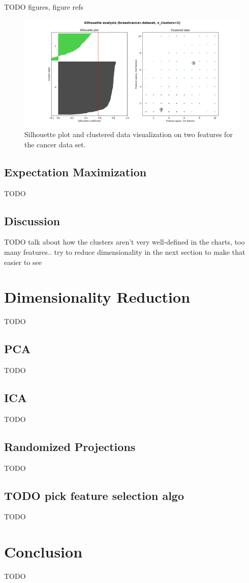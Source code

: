 \documentclass{article}
\begin{document}
      TODO figures, figure refs 

      \begin{figure}[htb]
      \centering
      \includegraphics[width=\linewidth]{out/kmeans/cancer-2-clusters.png}
      \caption{Silhouette plot and clustered data visualization on two features for the cancer data set.}
      \label{fig:km-silhouette-cancer}
      \end{figure}

    \subsection{Expectation Maximization}
      TODO

    \subsection{Discussion}
      TODO talk about how the clusters aren't very well-defined in the charts, too many features.. try to reduce dimensionality in the next section to make that easier to see

  \section{Dimensionality Reduction}
    TODO

    \subsection{PCA}
      TODO

    \subsection{ICA}
      TODO

    \subsection{Randomized Projections}
      TODO

    \subsection{TODO pick feature selection algo}
      TODO

  \section{Conclusion}
    TODO
\end{document}

